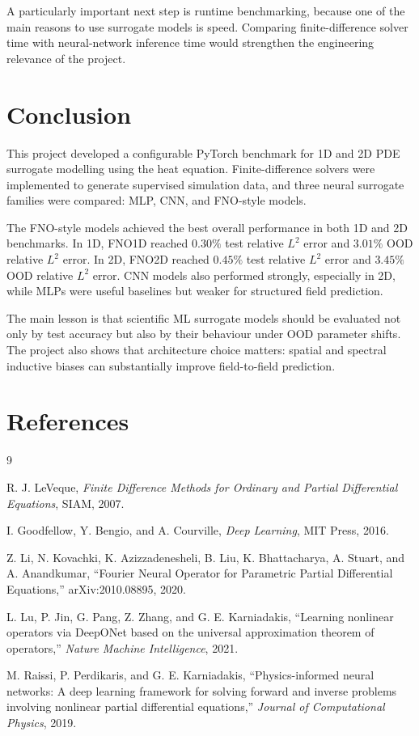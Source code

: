 \documentclass[11pt,a4paper]{article}
\begin{document}
A particularly important next step is runtime benchmarking, because one of the main reasons to use surrogate models is speed. Comparing finite-difference solver time with neural-network inference time would strengthen the engineering relevance of the project.

\section{Conclusion}

This project developed a configurable PyTorch benchmark for 1D and 2D PDE surrogate modelling using the heat equation. Finite-difference solvers were implemented to generate supervised simulation data, and three neural surrogate families were compared: MLP, CNN, and FNO-style models.

The FNO-style models achieved the best overall performance in both 1D and 2D benchmarks. In 1D, FNO1D reached \(0.30\%\) test relative \(L^2\) error and \(3.01\%\) OOD relative \(L^2\) error. In 2D, FNO2D reached \(0.45\%\) test relative \(L^2\) error and \(3.45\%\) OOD relative \(L^2\) error. CNN models also performed strongly, especially in 2D, while MLPs were useful baselines but weaker for structured field prediction.

The main lesson is that scientific ML surrogate models should be evaluated not only by test accuracy but also by their behaviour under OOD parameter shifts. The project also shows that architecture choice matters: spatial and spectral inductive biases can substantially improve field-to-field prediction.

\section*{References}

\begin{thebibliography}{9}

R. J. LeVeque,
\textit{Finite Difference Methods for Ordinary and Partial Differential Equations},
SIAM, 2007.

I. Goodfellow, Y. Bengio, and A. Courville,
\textit{Deep Learning},
MIT Press, 2016.

Z. Li, N. Kovachki, K. Azizzadenesheli, B. Liu, K. Bhattacharya, A. Stuart, and A. Anandkumar,
``Fourier Neural Operator for Parametric Partial Differential Equations,''
arXiv:2010.08895, 2020.

L. Lu, P. Jin, G. Pang, Z. Zhang, and G. E. Karniadakis,
``Learning nonlinear operators via DeepONet based on the universal approximation theorem of operators,''
\textit{Nature Machine Intelligence}, 2021.

M. Raissi, P. Perdikaris, and G. E. Karniadakis,
``Physics-informed neural networks: A deep learning framework for solving forward and inverse problems involving nonlinear partial differential equations,''
\textit{Journal of Computational Physics}, 2019.

\end{thebibliography}
\end{document}
